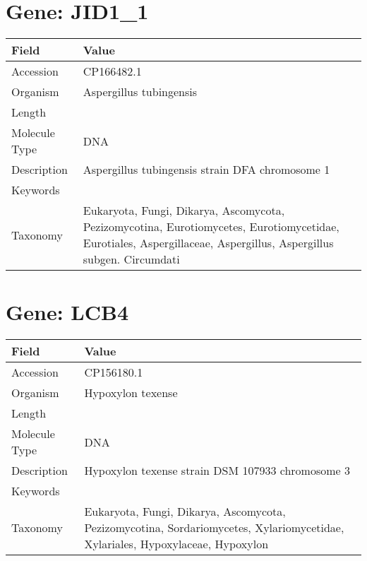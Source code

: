 \documentclass[10pt]{article}
\begin{document}
\section*{Gene: JID1\_1}
{\footnotesize
\begin{longtable}{>{\raggedright\arraybackslash}p{4.5cm} >{\raggedright\arraybackslash}p{11.5cm}}
\textbf{Field} & \textbf{Value} \\
\hline
Accession & CP166482.1 \\
Organism & Aspergillus tubingensis \\
Length & 6137164 \\
Molecule Type & DNA \\
Description & Aspergillus tubingensis strain DFA chromosome 1 \\
Keywords &  \\
Taxonomy & Eukaryota, Fungi, Dikarya, Ascomycota, Pezizomycotina, Eurotiomycetes, Eurotiomycetidae, Eurotiales, Aspergillaceae, Aspergillus, Aspergillus subgen. Circumdati \\
\end{longtable}
}


\section*{Gene: LCB4}
{\footnotesize
\begin{longtable}{>{\raggedright\arraybackslash}p{4.5cm} >{\raggedright\arraybackslash}p{11.5cm}}
\textbf{Field} & \textbf{Value} \\
\hline
Accession & CP156180.1 \\
Organism & Hypoxylon texense \\
Length & 5413564 \\
Molecule Type & DNA \\
Description & Hypoxylon texense strain DSM 107933 chromosome 3 \\
Keywords &  \\
Taxonomy & Eukaryota, Fungi, Dikarya, Ascomycota, Pezizomycotina, Sordariomycetes, Xylariomycetidae, Xylariales, Hypoxylaceae, Hypoxylon \\
\end{longtable}
}
\end{document}
